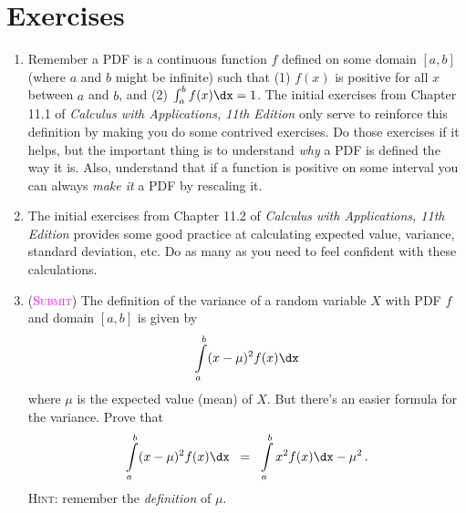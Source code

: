 \newpage

\section*{Exercises}

\begin{enumerate}
    \item %
        Remember a PDF is a continuous function $f$ defined on some domain $[a,b]$
        (where $a$ and $b$ might be infinite) 
        such that (1) $f(x)$ is positive for all $x$ between $a$ and $b$,
        and (2) $\int_a^b f(x) \dx =1 $. 
        The initial exercises from Chapter 11.1 of
        \emph{Calculus with Applications, 11th Edition}
        only serve to reinforce this definition by
        making you do some contrived exercises. 
        Do those exercises if it helps, 
        but the important thing is to understand
        \emph{why} a PDF is defined the way it is.
        Also, understand that if a function is positive on some interval
        you can always \emph{make it} a PDF by rescaling it.

    \item %
        The initial exercises from Chapter 11.2 of 
        \emph{Calculus with Applications, 11th Edition}
        provides some good practice at calculating 
        expected value, variance, standard deviation, etc. 
        Do as many as you need to feel confident with these calculations.

    \item 
        (\textsc{\textcolor{magenta}{Submit}})
        The definition of the variance of a random variable $X$
        with PDF $f$ and domain $[a,b]$ is given by
        \begin{equation*}
            \int\limits_a^b (x-\mu)^2 f(x) \dx
        \end{equation*}
        where $\mu$ is the expected value (mean) of $X$.
        But there's an easier formula for the variance. 
        Prove that
        \begin{equation*}
            \int\limits_a^b (x-\mu)^2 f(x) \dx
            \;\;=\;\;
            \int\limits_a^b x^2 f(x)\dx - \mu^2
            \,.
        \end{equation*}
        \textsc{Hint}: remember the \emph{definition} of $\mu$.
        


\end{enumerate}

